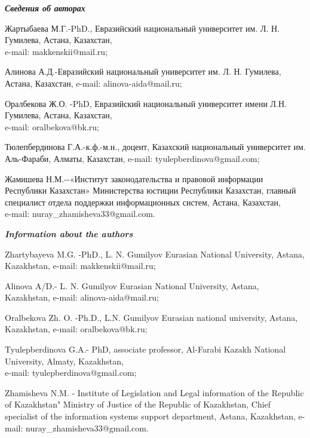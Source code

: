 \emph{{\bfseries Сведения об авторах}}
\begin{noparindent}

Жартыбаева М.Г.-PhD., Евразийский национальный университет им. Л. Н.
Гумилева, Астана, Казахстан, \\e-mail: makkenskii@mail.ru;

Алинова А.Д.-Евразийский национальный университет им. Л. Н. Гумилева,
Астана, Казахстан, e-mail: alinova-aida@mail.ru;

Оралбекова Ж.О. -PhD, Евразийский национальный университет имени Л.Н.
Гумилева, Астана, Казахстан,\\ e-mail: oralbekova@bk.ru;

Тюлепбердинова Г.А.-к.ф.-м.н., доцент, Казахский национальный
университет им. Аль-Фараби, Алматы, Казахстан, e-mail:
tyulepberdinova@gmail.com;

Жамишева Н.М.-\/-«Институт законодательства и правовой информации
Республики Казахстан» Министерства юстиции Республики Казахстан, главный
специалист отдела поддержки информационных систем, Астана, Казахстан,
\\e-mail: nuray\_zhamisheva33@gmail.com.
\end{noparindent}

\emph{{\bfseries Information about the authors}}
\begin{noparindent}

Zhartybayeva M.G. -PhD., L. N. Gumilyov Eurasian National University,
Astana, Kazakhstan, e-mail: makkenskii@mail.ru;

Alinova A/D.- L. N. Gumilyov Eurasian National University, Astana,
Kazakhstan, e-mail: alinova-aida@mail.ru;

Oralbekova Zh. O. -Ph.D., L.N. Gumilyov Eurasian national university,
Astana, Kazakhstan, e-mail: oralbekova@bk.ru;

Tyulepberdinova G.A.- PhD, associate professor, Al-Farabi Kazakh
National University, Almaty, Kazakhstan, \\e-mail:
tyulepberdinova@gmail.com;

Zhamisheva N.M. - Institute of Legislation and Legal information of the
Republic of Kazakhstan" Ministry of Justice of the Republic of
Kazakhstan, Chief specialist of the information systems support
department, Astana, Kazakhstan, e-mail: nuray\_zhamisheva33@gmail.com.


\end{noparindent}



